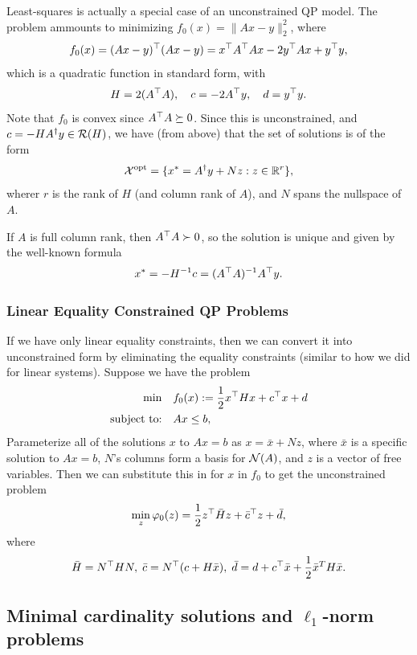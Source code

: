 \documentclass[11 pt]{scrartcl}
\begin{document}
\begin{example}
    Least-squares is actually a special case of an unconstrained QP model. 
    The problem ammounts to minimizing $f_0(x) = \|Ax-y\|_2^2$, where 
    \[ f_0(x) = (Ax-y)^\top (Ax-y) = x^\top A^\top A x - 2y^\top A x + y^\top y,\] 
    which is a quadratic function in standard form, with 
    \[ H = 2(A^\top A),\quad c = -2 A^\top y, \quad d = y^\top y.\] 
    Note that $f_0$ is convex since $A^\top A \succeq 0$. 
    Since this is unconstrained, and $c = -HA^\dagger y\in \mathcal R(H)$, we have (from above) that the set of solutions is of the form 
    \[ \mathcal X^{\text{opt}} = \{x^* = A^\dagger y + Nz : z\in \mathbb R^r\},\] 
    wherer $r$ is the rank of $H$ (and column rank of $A$), and $N$ spans the nullspace of $A$. 

    If $A$ is full column rank, then $A^\top A \succ 0$, so the solution is unique and given by the well-known formula 
    \[ x^* = -H^{-1} c = (A^\top A)^{-1} A^\top y.\] 
\end{example}

\subsubsection{Linear Equality Constrained QP Problems}

If we have only linear equality constraints, then we can convert it into unconstrained form by eliminating the equality constraints (similar to how we did for linear systems).
Suppose we have the problem 
\begin{align*}
    \min \quad &f_0(x) := \frac 12 x^\top Hx + c^\top x + d\\ 
    \text{subject to: }\;\; & Ax\leq b,
\end{align*}
Parameterize all of the solutions $x$ to $Ax=b$ as $x = \bar{x} + Nz$, where $\bar{x}$ is a specific solution to $Ax=b$, $N$'s columns form a basis for $\mathcal N(A)$, and $z$ is a vector of free variables.
Then we can substitute this in for $x$ in $f_0$ to get the unconstrained problem 
\[ \min_z \varphi_0(z) = \frac 12 z^\top \bar{H} z + \bar{c}^\top z + \bar{d},\] 
where 
\[ \bar{H} = N^\top H N,\; \bar{c} = N^\top (c + H\bar{x}),\; \bar{d} = d + c^\top \bar{x} + \frac 12 \bar{x}^T H \bar{x}.\] 

\subsection{Minimal cardinality solutions and \texorpdfstring{$\ell_1$}{l1}-norm problems}
\end{document}
